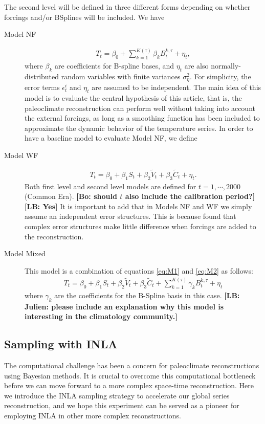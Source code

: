 \documentclass[11pt]{amsart}
\theoremstyle{plain}
\theoremstyle{definition}
\theoremstyle{remark}
\newcommand{\bl}[1]{\color{ForestGreen}\textbf{[Bo: #1]}\normalcolor}
\newcommand{\lb}[1]{\color{MidnightBlue}\textbf{[LB: #1]}\normalcolor}
\begin{document}
The second level will be defined in three different forms depending on whether
forcings and/or BSplines will be included. We have
\begin{description}
\item[Model NF]
  \begin{align}\label{eq:M1}
    T_t=\beta_0+\sum_{k=1}^{K(\tau)}\beta_k B_t^{k,\tau}+\eta_t,
  \end{align}
where $\beta_k$ are coefficients for B-spline bases, and
$\eta_t$ are also normally-distributed random variables with finite variances
$\sigma^2_{\eta}$. For simplicity, the error terms $\epsilon^i_t$ and $\eta_t$
are assumed to be independent. The main idea of this model is to evaluate the
central hypothesis of this article, that is, the paleoclimate reconstruction can
perform  well without taking into account the external forcings, as long as a
smoothing function has been included to approximate the dynamic behavior of the
temperature series. In order to have a baseline model to evaluate Model NF, we
define
\item[Model WF]
  \begin{align}\label{eq:M2}
    T_t=\beta_0+\beta_1S_t+\beta_2\tilde V_t+\beta_3\tilde C_t+\eta_t.
  \end{align}
Both first level and second level models are defined for
$t=1,\cdots,2000$ (Common Era). \bl{should $t$ also include the calibration period?}\lb{Yes} It is important to add that in Models NF and WF we simply assume
an independent error structures. This is because \cite{Barboza2014} 
found that complex error structures make little difference when forcings are
added to the reconstruction.
\item[Model Mixed]
  This model is a combination of equations \eqref{eq:M1} and \eqref{eq:M2} as follows:
  \begin{align*}
    T_t=\beta_0+\beta_1S_t+\beta_2\tilde V_t+\beta_3\tilde C_t+\sum_{k=1}^{K(\tau)}\gamma_k B_t^{k,\tau}+\eta_t
  \end{align*}
  where $\gamma_k$ are the coefficients for the B-Spline basis in this case. \lb{Julien: please include an explanation why this model is interesting in the
    climatology community.}
\end{description}

\subsection{Sampling with INLA}

The computational challenge has been a concern for paleoclimate reconstructions using Bayesian methods. It is crucial to overcome this computational bottleneck before we can move forward to a more complex space-time reconstruction. Here we introduce the INLA sampling strategy to accelerate our global series reconstruction, and we hope this experiment can be served as a pioneer for employing INLA in other more complex reconstructions. 
\end{document}
